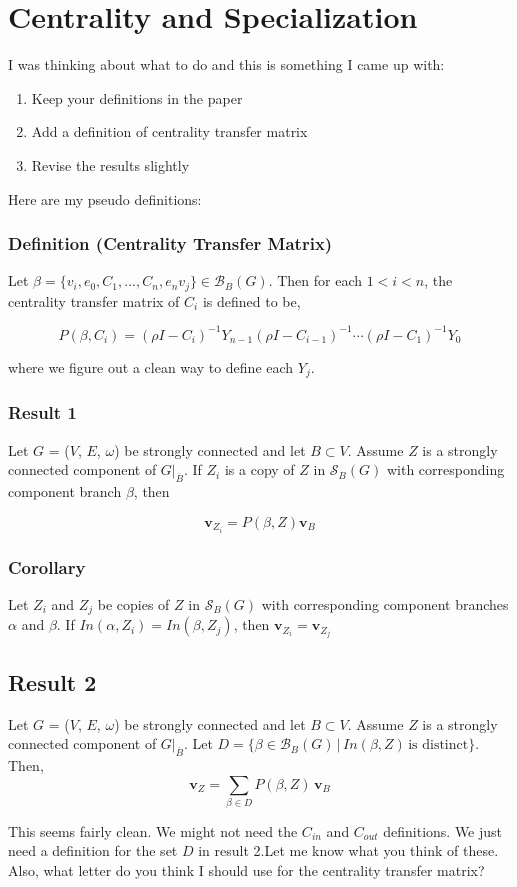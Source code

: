 \documentclass{paper}
\begin{document}
\section*{Centrality and Specialization}

I was thinking about what to do and this is something I came up with:
\begin{enumerate}
	\item Keep your definitions in the paper
	\item Add a definition of centrality transfer matrix
	\item Revise the results slightly
\end{enumerate}

Here are my pseudo definitions:

\subsubsection*{Definition (Centrality Transfer Matrix)}
Let $\beta = \{v_i, e_0, C_1, ..., C_n, e_n v_j \}  \in \mathcal{B}_B(G)$. Then for each $1 < i < n$, the centrality transfer matrix of  $C_i$ is defined to be,

\[
P(\beta,C_i) = (\rho I-C_i)^{-1}Y_{n-1}(\rho I-C_{i-1})^{-1}\cdots(\rho I - C_1)^{-1}Y_0
\]

where we figure out a clean way to define each $Y_j$.

\subsubsection*{Result 1}
Let $G$ = ($V$, $E$, $\omega$) be strongly connected and let $B \subset V$. Assume $Z$ is a strongly connected component of $G|_{\overline{B}}$. If $Z_i$ is a copy of $Z$ in $\mathcal{S}_B(G)$ with corresponding component branch $\beta$, then

\[
\mathbf{v}_{Z_i} = P(\beta,Z)\mathbf{v}_{B}
\]

\subsubsection*{Corollary}
Let $Z_i$ and $Z_j$ be copies of $Z$ in $\mathcal{S}_B(G)$ with corresponding component branches $\alpha$ and $\beta$. If $In(\alpha,Z_i) = In(\beta,Z_j)$, then $\mathbf{v}_{Z_i} = \mathbf{v}_{Z_j}$

\subsection*{Result 2}
Let $G$ = ($V$, $E$, $\omega$) be strongly connected and let $B \subset V$. Assume $Z$ is a strongly connected component of $G|_{\overline{B}}$. Let $D = \{\beta \in \mathcal{B}_B(G) \, |\, In(\beta,Z)\, \text{is distinct} \}$. Then,
\[
\mathbf{v}_Z = \sum_{\beta \in D}P(\beta,Z)\,\mathbf{v}_B
\]


This seems fairly clean. We might not need the $C_{in}$ and $C_{out}$ definitions. We just need a definition for the set $D$ in result 2.Let me know what you think of these. Also, what letter do you think I should use for the centrality transfer matrix?
\end{document}
